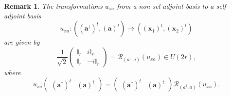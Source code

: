 \documentclass[aps,preprint]{revtex4}
\newtheorem{remark}[theorem]{Remark}
\begin{document}
\begin{remark}
The transformations $u_{xa}$ from a non sel adjoint basis to a self adjoint
basis 
\begin{equation}
u_{xa}:\left( \overset{}{\left( \boldsymbol{a}^{\dagger }\right) ^{t},\left( 
\boldsymbol{a}\right) ^{t}}\right) \rightarrow \left( \overset{}{\left( 
\boldsymbol{x}_{1}\right) ^{t},\left( \boldsymbol{x}_{2}\right) ^{t}}\right)
\end{equation}%
are given by 
\begin{equation}
\frac{1}{\sqrt{2}}\left( 
\begin{array}{cc}
\mathbb{I}_{r} & i\mathbb{I}_{r} \\ 
\mathbb{I}_{r} & -i\mathbb{I}_{r}%
\end{array}%
\right) =\mathcal{R}_{\left( a^{\dagger },a\right) }\left( u_{xa}\right) \in
U\left( 2r\right) ,
\end{equation}%
where 
\begin{equation}
u_{xa}\left( 
\begin{array}{cc}
\left( \boldsymbol{a}^{\dagger }\right) ^{t} & \left( \boldsymbol{a}\right)
^{t}%
\end{array}%
\right) =\left( 
\begin{array}{cc}
\left( \boldsymbol{a}^{\dagger }\right) ^{t} & \left( \boldsymbol{a}\right)
^{t}%
\end{array}%
\right) \mathcal{R}_{\left( a^{\dagger },a\right) }\left( u_{xa}\right) .
\end{equation}
\end{remark}
\end{document}

